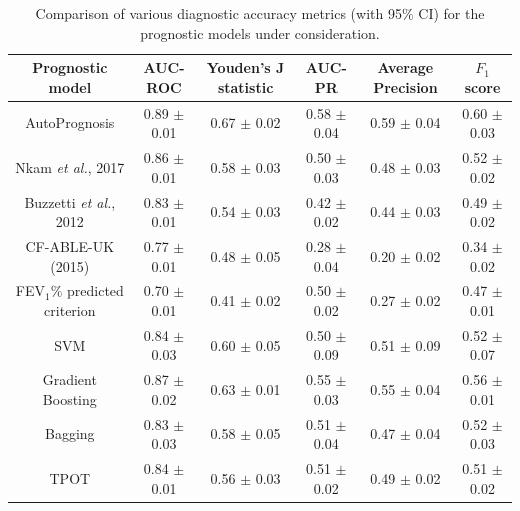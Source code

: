 \documentclass [PhD] {uclathes}
\begin{document}
\begin{table}
\centering
\begin{tabular}{|c||c|c|c|c|c|}
\hline
{\bf Prognostic model} & {\bf AUC-ROC} & {\bf Youden's J statistic} & {\bf AUC-PR} & {\bf Average Precision} & {\bf $F_1$ score}      \\\hline\hline
{\footnotesize AutoPrognosis} & {\footnotesize 0.89 $\pm$ 0.01} & {\footnotesize 0.67 $\pm$ 0.02} & {\footnotesize 0.58 $\pm$ 0.04} & {\footnotesize 0.59 $\pm$ 0.04} & {\footnotesize 0.60 $\pm$ 0.03} \\\hline\hline\hline
{\footnotesize Nkam {\it et al.}\cite{nkam20173}, 2017} & {\footnotesize 0.86 $\pm$ 0.01} & {\footnotesize 0.58 $\pm$ 0.03} & {\footnotesize 0.50 $\pm$ 0.03} & {\footnotesize 0.48 $\pm$ 0.03} & {\footnotesize 0.52 $\pm$ 0.02} \\\hline
{\footnotesize Buzzetti {\it et al.}\cite{buzzetti2012validation}, 2012} & {\footnotesize 0.83 $\pm$ 0.01} & {\footnotesize 0.54 $\pm$ 0.03} & {\footnotesize 0.42 $\pm$ 0.02} & {\footnotesize 0.44 $\pm$ 0.03} & {\footnotesize 0.49 $\pm$ 0.02}  \\\hline
{\footnotesize CF-ABLE-UK \cite{dimitrov2015cf} (2015)} & {\footnotesize 0.77 $\pm$ 0.01} & {\footnotesize 0.48 $\pm$ 0.05} & {\footnotesize 0.28 $\pm$ 0.04} & {\footnotesize 0.20 $\pm$ 0.02} & {\footnotesize 0.34 $\pm$ 0.02} \\\hline
{\footnotesize FEV$_1\%$ predicted criterion\cite{kerem1992prediction}} & {\footnotesize 0.70 $\pm$ 0.01} & {\footnotesize 0.41 $\pm$ 0.02} & {\footnotesize 0.50 $\pm$ 0.02} & {\footnotesize 0.27 $\pm$ 0.02} & {\footnotesize 0.47 $\pm$ 0.01}  \\\hline\hline\hline
{\footnotesize SVM} & {\footnotesize 0.84 $\pm$ 0.03} & {\footnotesize 0.60 $\pm$ 0.05} & {\footnotesize 0.50 $\pm$ 0.09} & {\footnotesize 0.51 $\pm$ 0.09} & {\footnotesize 0.52 $\pm$ 0.07} \\\hline 
{\footnotesize Gradient Boosting} & {\footnotesize 0.87 $\pm$ 0.02} & {\footnotesize 0.63 $\pm$ 0.01} & {\footnotesize 0.55 $\pm$ 0.03} & {\footnotesize 0.55 $\pm$ 0.04} & {\footnotesize 0.56 $\pm$ 0.01} \\\hline
{\footnotesize Bagging} & {\footnotesize 0.83 $\pm$ 0.03} & {\footnotesize 0.58 $\pm$ 0.05} & {\footnotesize 0.51 $\pm$ 0.04} & {\footnotesize 0.47 $\pm$ 0.04} & {\footnotesize 0.52 $\pm$ 0.03}\\\hline\hline\hline
{\footnotesize TPOT} & {\footnotesize 0.84 $\pm$ 0.01} & {\footnotesize 0.56 $\pm$ 0.03} & {\footnotesize 0.51 $\pm$ 0.02} & {\footnotesize 0.49 $\pm$ 0.02} & {\footnotesize 0.51 $\pm$ 0.02} \\
\hline
\end{tabular}
\caption{Comparison of various diagnostic accuracy metrics (with 95$\%$ CI) for the prognostic models under consideration.}
\label{ch6Table3}
\end{table} 
\end{document}
